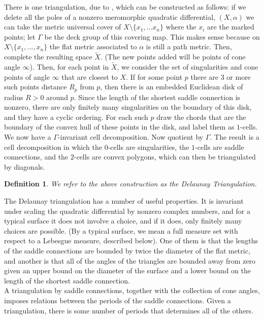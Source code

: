 \documentclass[12pt]{article}
\newtheorem{definition}[theorem]{Definition}
\begin{document}
\noindent There is one triangulation, due to \cite{Delaunay}, which can be constructed as follows: if we delete all the poles of a nonzero meromorphic quadratic differential, $(X,\alpha)$ we can take the metric universal cover of $X \setminus \{x_1,...x_n\}$ where the $x_i$ are the marked points; let $\Gamma$ be the deck group of this covering map. This makes sense because on $X \setminus \{x_1,...,x_n\}$ the flat metric associated to $\alpha$ is still a path metric. Then, complete the resulting space $\tilde{X}$. (The new points added will be points of cone angle $\infty$). Then, for each point in $\tilde{X}$, we consider the set of singularities and cone points of angle $\infty$ that are closest to $X$. If for some point $p$ there are 3 or more such points distance $R_p$ from $p$, then there is an embedded Euclidean disk of radius $R > 0$ around $p$. Since the length of the shortest saddle connection is nonzero, there are only finitely many singularities on the boundary of this disk, and they have a cyclic ordering. For each such $p$ draw the chords that are the boundary of the convex hull of these points in the disk, and label them as $1$-cells. We now have a $\Gamma$-invariant cell decomposition. Now quotient by $\Gamma$. The result is a cell decomposition in which the $0$-cells are singularities, the $1$-cells are saddle connections, and the $2$-cells are convex polygons, which can then be triangulated by diagonals.

\begin{definition}We refer to the above construction as the \emph{Delaunay Triangulation}. \end{definition}

\noindent The Delaunay triangulation has a number of useful properties. It is invariant under scaling the quadratic differential by nonzero complex numbers, and for a typical surface it does not involve a choice, and if it does, only finitely many choices are possible. (By a typical surface, we mean a full measure set with respect to a Lebesgue measure, described below). One of them is that the lengths of the saddle connections are bounded by twice the diameter of the flat metric, and another is that all of the angles of the triangles are bounded away from zero given an upper bound on the diameter of the surface and a lower bound on the length of the shortest saddle connection.\\

\noindent A triangulation by saddle connections, together with the collection of cone angles, imposes relations between the periods of the saddle connections. Given a triangulation, there is some number of periods that determines all of the others.\\
\end{document}
